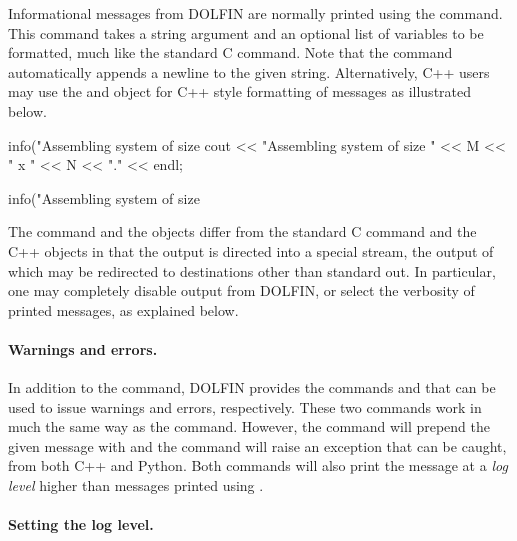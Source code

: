 Informational messages from DOLFIN are normally printed using the
 command. This command takes a string argument and an
optional list of variables to be formatted, much like the standard
C  command. Note that the  command
automatically appends a newline to the given string. Alternatively,
C++ users may use the  and  object
for C++ style formatting of messages as illustrated below.
\begin{c++}
info("Assembling system of size %
cout << "Assembling system of size " << M << " x " << N << "." << endl;
\end{c++}
\begin{python}
info("Assembling system of size %
\end{python}
The  command and the  objects differ
from the standard C  command and the C++ 
objects in that the output is directed into a special stream, the output
of which may be redirected to destinations other than standard out. In
particular, one may completely disable output from DOLFIN, or select
the verbosity of printed messages, as explained below.

\paragraph{Warnings and errors.}

In addition to the  command, DOLFIN provides the
commands  and  that can be used to issue
warnings and errors, respectively. These two commands work in much the
same way as the  command. However, the  command
will prepend the given message with  and the
 command will raise an exception that can be caught, from
both C++ and Python. Both commands will also print the message at a
\emph{log level} higher than messages printed using .


\paragraph{Setting the log level.}

